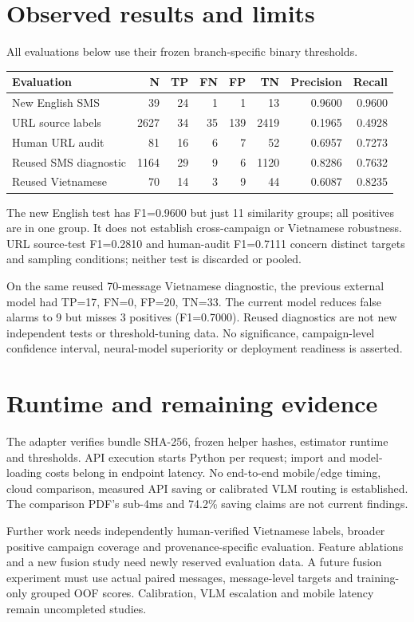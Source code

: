\documentclass[11pt]{article}
\begin{document}
\section{Observed results and limits}
All evaluations below use their frozen branch-specific binary thresholds.
\begin{center}
\small
\begin{tabular}{lrrrrrrr}
\toprule
Evaluation & N & TP & FN & FP & TN & Precision & Recall\\
\midrule
New English SMS & 39 & 24 & 1 & 1 & 13 & 0.9600 & 0.9600\\
URL source labels & 2627 & 34 & 35 & 139 & 2419 & 0.1965 & 0.4928\\
Human URL audit & 81 & 16 & 6 & 7 & 52 & 0.6957 & 0.7273\\
Reused SMS diagnostic & 1164 & 29 & 9 & 6 & 1120 & 0.8286 & 0.7632\\
Reused Vietnamese & 70 & 14 & 3 & 9 & 44 & 0.6087 & 0.8235\\
\bottomrule
\end{tabular}
\end{center}
The new English test has F1=0.9600 but just 11 similarity groups; all positives
are in one group. It does not establish cross-campaign or Vietnamese robustness.
URL source-test F1=0.2810 and human-audit F1=0.7111 concern distinct targets and
sampling conditions; neither test is discarded or pooled.

On the same reused 70-message Vietnamese diagnostic, the previous external model
had TP=17, FN=0, FP=20, TN=33. The current model reduces false alarms to 9 but
misses 3 positives (F1=0.7000). Reused diagnostics are not new independent tests
or threshold-tuning data. No significance, campaign-level confidence interval,
neural-model superiority or deployment readiness is asserted.

\section{Runtime and remaining evidence}
The adapter verifies bundle SHA-256, frozen helper hashes, estimator runtime and
thresholds. API execution starts Python per request; import and model-loading
costs belong in endpoint latency. No end-to-end mobile/edge timing, cloud
comparison, measured API saving or calibrated VLM routing is established.
The comparison PDF's sub-4ms and 74.2\% saving claims are not current findings.

Further work needs independently human-verified Vietnamese labels, broader positive
campaign coverage and provenance-specific evaluation. Feature ablations and a new
fusion study need newly reserved evaluation data. A future fusion experiment must
use actual paired messages, message-level targets and training-only grouped OOF
scores. Calibration, VLM escalation and mobile latency remain uncompleted studies.
\end{document}
